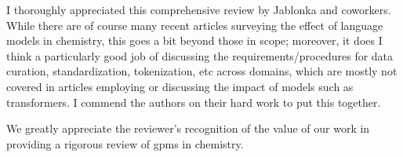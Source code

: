 
\begin{point}
I thoroughly appreciated this comprehensive review by Jablonka and coworkers. While there are of course many recent articles surveying the effect of language models in chemistry, this goes a bit beyond those in scope; moreover, it does I think a particularly good job of discussing the requirements/procedures for data curation, standardization, tokenization, etc across domains, which are mostly not covered in articles employing or discussing the impact of models such as transformers. I commend the authors on their hard work to put this together.
\end{point}

\begin{reply}
We greatly appreciate the reviewer's recognition of the value of our work in providing a rigorous review of \glspl{gpm} in chemistry. 
\end{reply}

